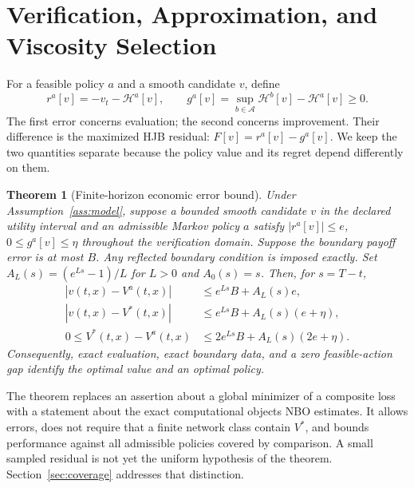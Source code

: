 \documentclass[ecta,draft]{econsocart}
\newtheorem{theorem}{Theorem}
\theoremstyle{definition}
\theoremstyle{remark}
\newcommand{\HH}{\mathcal H}
\newcommand{\Act}{\mathcal A}
\begin{document}


\section{Verification, Approximation, and Viscosity Selection}\label{sec:theory}
For a feasible policy $a$ and a smooth candidate $v$, define
\begin{equation}\label{eq:errors}
 r^a[v]=-v_t-\HH^a[v],\qquad
 g^a[v]=\sup_{b\in\Act}\HH^b[v]-\HH^a[v]\geq0.
\end{equation}
The first error concerns evaluation; the second concerns improvement. Their difference is the maximized HJB residual: $F[v]=r^a[v]-g^a[v]$. We keep the two quantities separate because the policy value and its regret depend differently on them.

\begin{theorem}[Finite-horizon economic error bound]\label{thm:verification}
Under Assumption~\ref{ass:model}, suppose a bounded smooth candidate $v$ in the declared utility interval and an admissible Markov policy $a$ satisfy $|r^a[v]|\leq e$, $0\leq g^a[v]\leq\eta$ throughout the verification domain. Suppose the boundary payoff error is at most $B$. Any reflected boundary condition is imposed exactly. Set $A_L(s)=(e^{Ls}-1)/L$ for $L>0$ and $A_0(s)=s$. Then, for $s=T-t$,
\begin{align}
 |v(t,x)-V^a(t,x)|&\leq e^{Ls}B+A_L(s)e,\label{eq:policybound}\\
 |v(t,x)-V^*(t,x)|&\leq e^{Ls}B+A_L(s)(e+\eta),\label{eq:valuebound}\\
 0\leq V^*(t,x)-V^a(t,x)&\leq2e^{Ls}B+A_L(s)(2e+\eta).\label{eq:regret}
\end{align}
Consequently, exact evaluation, exact boundary data, and a zero feasible-action gap identify the optimal value and an optimal policy.
\end{theorem}

The theorem replaces an assertion about a global minimizer of a composite loss with a statement about the exact computational objects NBO estimates. It allows errors, does not require that a finite network class contain $V^*$, and bounds performance against all admissible policies covered by comparison. A small sampled residual is not yet the uniform hypothesis of the theorem. Section~\ref{sec:coverage} addresses that distinction.
\end{document}
